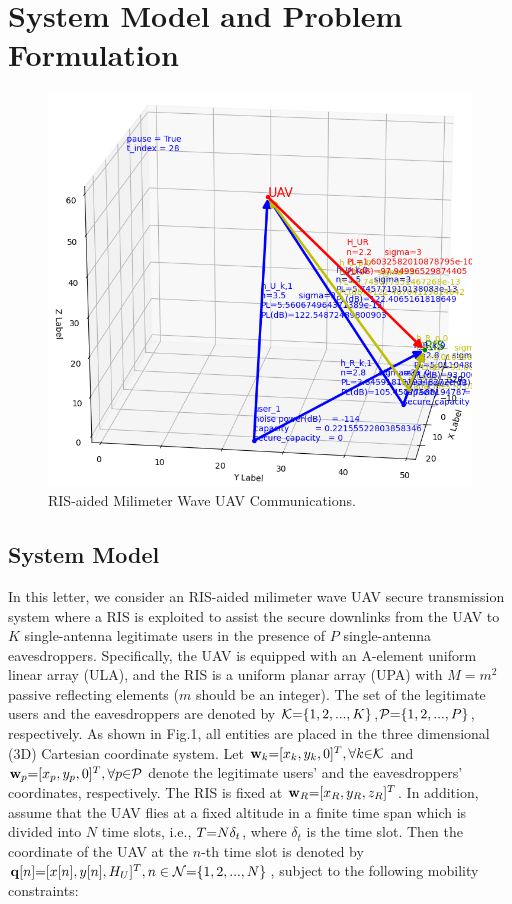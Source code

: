 \documentclass[journal]{IEEEtran}
\begin{document}
\section{System Model and Problem Formulation}
\begin{figure}[t]
	\centering
	\includegraphics[width=1.0\linewidth]{./plot/Fig1.png}%
	\caption{RIS-aided Milimeter Wave UAV Communications.}  %
\end{figure}
\subsection{System Model}
In this letter, we consider an RIS-aided milimeter wave UAV secure transmission system where a RIS is exploited to assist the secure downlinks from the UAV to $K$ single-antenna legitimate users in the presence of $P$ single-antenna eavesdroppers. Specifically, the UAV is equipped with an A-element uniform linear array (ULA), and the RIS is a uniform planar array (UPA) with $M=m^2$ passive reflecting elements ($m$ should be an integer). The set of the legitimate users and the eavesdroppers are denoted by ${\cal K}{\rm =}\{ 1,2,...,K \}$,${\cal P}{\rm =}\{1,2,...,P \}$, respectively. As shown in Fig.1, all entities are placed in the three dimensional (3D) Cartesian coordinate system. Let ${\bf{w}}_{k}{\rm{ = }}[x_k,y_k,0]^T,\forall k{\rm \in}{\cal K}$ and ${\bf{w}}_{p}{\rm{ = }}[x_p,y_p,0]^T,\forall p{\rm \in}{\cal P}$ denote the legitimate users' and the eavesdroppers' coordinates, respectively. The RIS is fixed at ${\bf{w}}_{R}{\rm{ = }}[x_R,y_R,z_R]^T$. In addition, assume that the UAV flies at a fixed altitude in a finite time span which is divided into $N$ time slots, i.e., $T{\rm{ = }}N\delta_t$, where $\delta_t$ is the time slot. Then the coordinate of the UAV at the $n$-th time slot is denoted by ${\bf{q}}[n]{\rm{ = }}[x[n],y[n],H_{U}]^T, n \in {\cal N}{\rm{ = }}\{ 1,2,...,N \}$, subject to the following mobility constraints:
\end{document}

